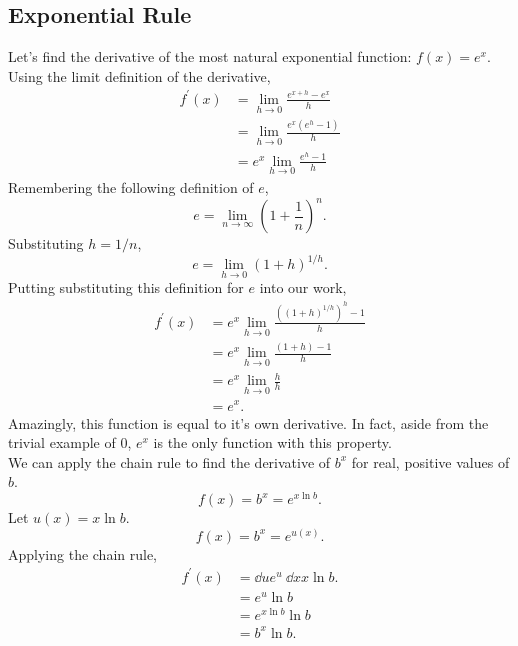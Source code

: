 \subsection{Exponential Rule}
Let's find the derivative of the most natural exponential function: $f(x) = e^x$.
Using the limit definition of the derivative,
\begin{align*}
	f^\prime(x) &= \lim_{h \to 0}{\frac{e^{x+h}-e^x}{h}} \\
	&= \lim_{h \to 0}{\frac{e^x\left(e^h - 1\right)}{h}} \\
	&= e^x \lim_{h \to 0}{\frac{e^h - 1}{h}}
\end{align*}
Remembering the following definition of $e$,
\begin{equation*}
	e = \lim_{n \to \infty}{\left(1+\frac{1}{n}\right)^n}.
\end{equation*}
Substituting $h = 1/n$,
\begin{equation*}
	e = \lim_{h \to 0}{\left(1+h\right)^{1/h}}.
\end{equation*}
Putting substituting this definition for $e$ into our work,
\begin{align*}
	f^\prime(x) &= e^x \lim_{h \to 0}{\frac{\left(\left(1+h\right)^{1/h}\right)^h-1}{h}} \\
	&= e^x \lim_{h \to 0}{\frac{\left(1+h\right)-1}{h}} \\
	&= e^x \lim_{h \to 0}{\frac{h}{h}} \\
	&= e^x.
\end{align*}
Amazingly, this function is equal to it's own derivative. In fact, aside from the trivial example of $0$, $e^x$ is the only function with this property. \\


We can apply the chain rule to find the derivative of $b^x$ for real, positive values of $b$.
\begin{equation*}
	f(x) = b^x	= e^{x\ln{b}}.
\end{equation*}
Let $u(x) = x\ln{b}$.
\begin{equation*}
	f(x) = b^x = e^{u(x)}.
\end{equation*}
Applying the chain rule,
\begin{align*}
	f^\prime(x) &= \dd{}{u}e^u \hspace{3pt} \dd{}{x}x\ln{b}. \\
	&= e^u \ln{b} \\
	&= e^{x\ln{b}} \ln{b} \\
	&= b^x \ln{b}.
\end{align*}

